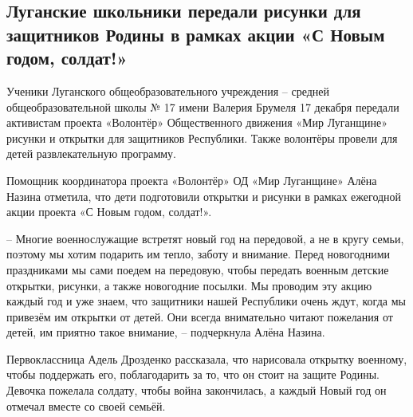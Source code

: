 
 
 
 
 
\subsection{Луганские школьники передали рисунки для защитников Родины в рамках акции «С Новым годом, солдат!»}
\label{sec:17_12_2021.stz.news.lnr.mirlug.1.shkolniki_risunki_zaschitniki}


Ученики Луганского общеобразовательного учреждения – средней
общеобразовательной школы № 17 имени Валерия Брумеля 17 декабря передали
активистам проекта «Волонтёр» Общественного движения «Мир Луганщине» рисунки и
открытки для защитников Республики. Также волонтёры провели для детей
развлекательную программу.


Помощник координатора проекта «Волонтёр» ОД «Мир Луганщине» Алёна Назина
отметила, что дети подготовили открытки и рисунки в рамках ежегодной акции
проекта «С Новым годом, солдат!».

– Многие военнослужащие встретят новый год на передовой, а не в кругу семьи,
поэтому мы хотим подарить им тепло, заботу и внимание. Перед новогодними
праздниками мы сами поедем на передовую, чтобы передать военным детские
открытки, рисунки, а также новогодние посылки. Мы проводим эту акцию каждый год
и уже знаем, что защитники нашей Республики очень ждут, когда мы привезём им
открытки от детей. Они всегда внимательно читают пожелания от детей, им приятно
такое внимание, – подчеркнула Алёна Назина.


Первоклассница Адель Дрозденко рассказала, что нарисовала открытку военному,
чтобы поддержать его, поблагодарить за то, что он стоит на защите Родины.
Девочка пожелала солдату, чтобы война закончилась, а каждый Новый год он
отмечал вместе со своей семьёй.

